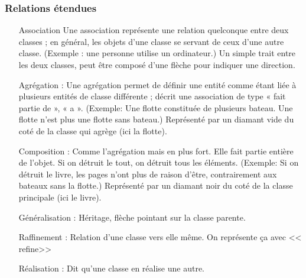 \subsubsection{Relations étendues}
\begin{itemize}
	\item [Association] Une association représente une relation quelconque entre deux classes ; en général, les objets d’une classe se servant de ceux d’une autre classe. (Exemple : une personne utilise un ordinateur.) Un simple trait entre les deux classes, peut être composé d’une flèche pour indiquer une direction.

	\item [Agrégation]: Une agrégation permet de définir une entité comme étant liée à plusieurs entités de classe différente ; décrit une association de type « fait partie de », « a ». (Exemple: Une flotte constituée de plusieurs bateau. Une flotte n’est plus une flotte sans bateau.) Représenté par un diamant vide du coté de la classe qui agrège (ici la flotte). 

	\item [Composition]: Comme l’agrégation mais en plus fort. Elle fait partie entière de l’objet. Si on détruit le tout, on détruit tous les éléments. (Exemple: Si on détruit le livre, les pages n’ont plus de raison d’être, contrairement aux bateaux sans la flotte.) Représenté par un diamant noir du coté de la classe principale (ici le livre).

	\item [Généralisation]: Héritage, flèche pointant sur la classe parente.

	\item [Raffinement]: Relation d’une classe vers elle même. On représente ça avec << refine>>

	\item [Réalisation]: Dit qu’une classe en réalise une autre.
\end{itemize}